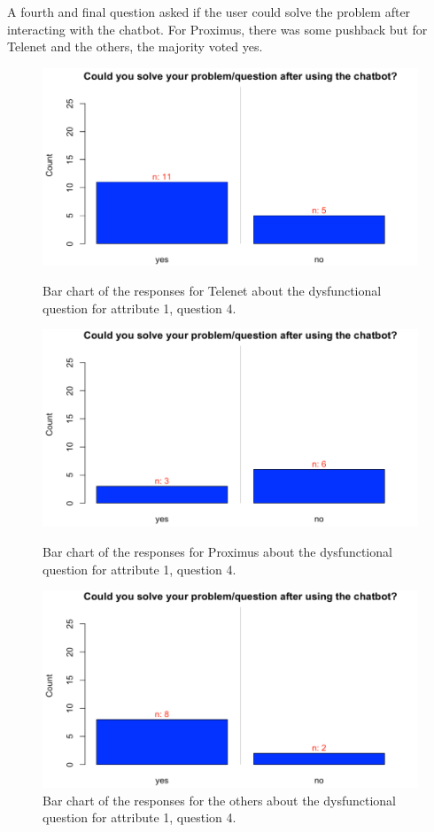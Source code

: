 A fourth and final question asked if the user could solve the problem after interacting with the chatbot. For Proximus, there was some pushback but for Telenet and the others, the majority voted yes.\\
\begin{figure}[!htb]
	\includegraphics[width=\linewidth]{../LaTeX/Figures/Comparative/DQ1Tc.png}
	\caption{Bar chart of the responses for Telenet about the dysfunctional question for attribute 1, question 4.}\label{fig:DQ1Tc}
	\endminipage\hfill
	\includegraphics[width=\linewidth]{../LaTeX/Figures/Comparative/DQ1Pc.png}
	\caption{Bar chart of the responses for Proximus about the dysfunctional question for attribute 1, question 4.}\label{fig:DQ1Pc}
	\endminipage\hfill
	\includegraphics[width=\linewidth]{../LaTeX/Figures/Comparative/DQ1Oc.png}
	\caption{Bar chart of the responses for the others about the dysfunctional question for attribute 1, question 4.}\label{fig:DQ1Oc}
	\endminipage\hfill
\end{figure}
